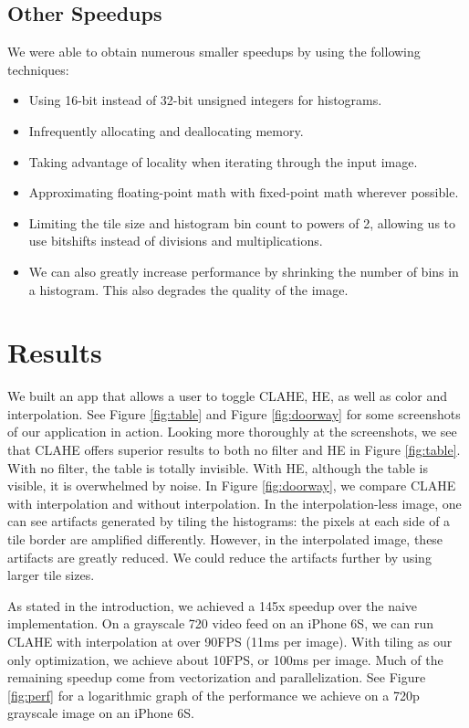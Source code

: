 \documentclass[10pt,twocolumn,letterpaper]{article}
\begin{document}
\subsection{Other Speedups}

We were able to obtain numerous smaller speedups by using the following techniques:
\begin{itemize}
\itemsep0em
\item Using 16-bit instead of 32-bit unsigned integers for histograms.
\item Infrequently allocating and deallocating memory.
\item Taking advantage of locality when iterating through the input image.
\item Approximating floating-point math with fixed-point math wherever possible.
\item Limiting the tile size and histogram bin count to powers of 2, allowing us to use bitshifts instead of divisions and multiplications.
\item We can also greatly increase performance by shrinking the number of bins in a histogram. This also degrades the quality of the image.
\end{itemize}

\section{Results}

We built an app that allows a user to toggle CLAHE, HE, as well as color and interpolation. See Figure \ref{fig:table} and Figure \ref{fig:doorway} for some screenshots of our application in action. Looking more thoroughly at the screenshots, we see that CLAHE offers superior results to both no filter and HE in Figure \ref{fig:table}. With no filter, the table is totally invisible. With HE, although the table is visible, it is overwhelmed by noise. In Figure \ref{fig:doorway}, we compare CLAHE with interpolation and without interpolation. In the interpolation-less image, one can see artifacts generated by tiling the histograms: the pixels at each side of a tile border are amplified differently. However, in the interpolated image, these artifacts are greatly reduced. We could reduce the artifacts further by using larger tile sizes.

As stated in the introduction, we achieved a 145x speedup over the naive implementation. On a grayscale 720 video feed on an iPhone 6S, we can run CLAHE with interpolation at over 90FPS (11ms per image). With tiling as our only optimization, we achieve about 10FPS, or 100ms per image. Much of the remaining speedup come from vectorization and parallelization. See Figure \ref{fig:perf} for a logarithmic graph of the performance we achieve on a 720p grayscale image on an iPhone 6S.
\end{document}
